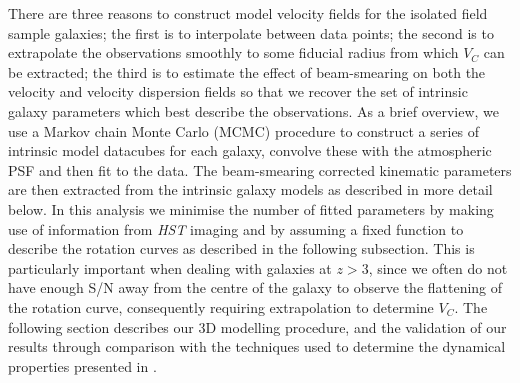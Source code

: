 \documentclass[fleqn,usenatbib]{mn2e}
\begin{document}
There are three reasons to construct model velocity fields for the isolated field sample galaxies; the first is to interpolate between data points; the second is to extrapolate the observations smoothly to some fiducial radius from which $V_{C}$ can be extracted; the third is to estimate the effect of beam-smearing on both the velocity and velocity dispersion fields so that we recover the set of intrinsic galaxy parameters which best describe the observations.
As a brief overview, we use a Markov chain Monte Carlo (MCMC) procedure to construct a series of intrinsic model datacubes for each galaxy, convolve these with the atmospheric PSF and then fit to the data.
The beam-smearing corrected kinematic parameters are then extracted from the intrinsic galaxy models as described in more detail below.
In this analysis we minimise the number of fitted parameters by making use of information from {\em HST} imaging and by assuming a fixed function to describe the rotation curves as described in the following subsection.    
This is particularly important when dealing with galaxies at $z > 3$, since we often do not have enough S/N away from the centre of the galaxy to observe the flattening of the rotation curve, consequently requiring extrapolation to determine $V_{C}$.  
The following section describes our 3D modelling procedure, and the validation of our results through comparison with the techniques used to determine the dynamical properties presented in \cite{Harrison2017}.
\end{document}
